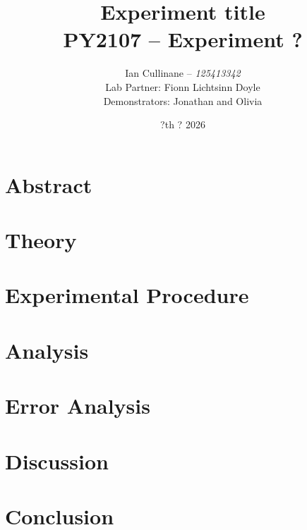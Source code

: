 \documentclass[12pt,a4paper]{article}
\title{
    \Large\textbf{Experiment title}\\[0.5em]
    \large PY2107 -- Experiment ?
}
\author{
    Ian Cullinane -- \textit{125413342}\\[0.5em]
    Lab Partner: Fionn Lichtsinn Doyle\\[0.5em]
    Demonstrators: Jonathan and Olivia
}
\date{?th ? 2026}
\begin{document}
\maketitle
\thispagestyle{empty}

\newpage
\tableofcontents
\newpage

\section{Abstract}

\newpage

\section{Theory}

\newpage

\section{Experimental Procedure}

\newpage

\section{Analysis}

\newpage

\section{Error Analysis}

\newpage

\section{Discussion}

\newpage

\section{Conclusion}
\end{document}
